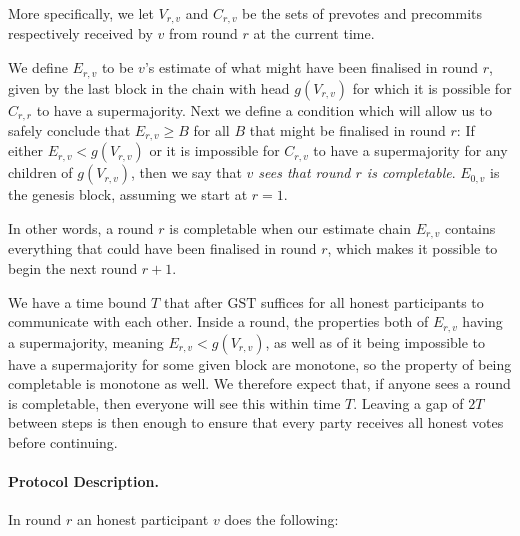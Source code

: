\documentclass{article}
\def\GST{\mathrm{GST}}
\begin{document}
More specifically, we let $V_{r,v}$ and $C_{r,v}$ be the sets of prevotes and precommits respectively received by $v$ from round $r$ at the current time.

We define $E_{r,v}$ to be $v$'s estimate of what might have been finalised in round $r$, given by the last block in the chain with head $g(V_{r,v})$ for which it is possible for $C_{r,r}$ to have a supermajority. Next we define a condition which will allow us to safely conclude that $E_{r,v} \geq B$ for all $B$ that might be finalised in round $r$:
If either $E_{r,v} < g(V_{r,v})$ or it is impossible for $C_{r,v}$ to have a supermajority for any children of $g(V_{r,v})$, then we say that {\em $v$ sees that round $r$ is completable}.  $E_{0,v}$ is the genesis block, assuming we start at $r=1$.  

In other words, a round $r$ is completable when our estimate chain $E_{r,v}$ contains everything that could have been finalised in round $r$, which makes it possible to begin the next round $r+1$.

We have a time bound $T$ that after $\GST$ suffices for all honest participants to communicate with each other.
Inside a round, the properties both of $E_{r,v}$ having a supermajority, meaning $E_{r,v} < g(V_{r,v})$, as well as of it being impossible to have a supermajority for some given block are monotone, so the property of being completable is monotone as well.
We therefore expect that, if anyone sees a round is completable, then everyone will see this within time $T$. Leaving a gap of $2T$ between steps is then enough to ensure that every party receives all honest votes before continuing.


\paragraph{Protocol Description.}
In round $r$ an honest participant $v$ does the following:
\end{document}
